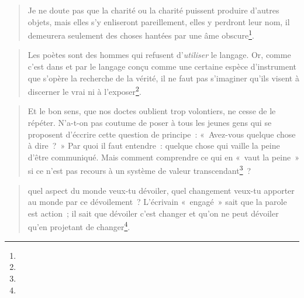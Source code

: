 \documentclass[12pt, a4paper]{article}
\begin{document}
\begin{quote}
    Je ne doute pas que la charité ou la charité puissent produire d'autres objets, mais elles s'y enliseront pareillement, elles y perdront leur nom, il demeurera seulement des choses hantées par une âme obscure\footnote{}.
\end{quote}
\begin{quote}
    Les poètes sont des hommes qui refusent d'\textit{utiliser} le langage. Or, comme c'est dans et par le langage conçu comme une certaine espèce d'instrument que s'opère la recherche de la vérité, il ne faut pas s'imaginer qu'ils visent à discerner le vrai ni à l'exposer\footnote{}.
\end{quote}

\begin{quote}
    Et le bon sens, que nos doctes oublient trop volontiers, ne cesse de le répéter. N'a-t-on pas coutume de poser à tous les jeunes gens qui se proposent d'éccrire cette question de principe~: «~Avez-vous quelque chose à dire~?~» Par quoi il faut entendre~: quelque chose qui vaille la peine d'être communiqué. Mais comment comprendre ce qui en «~vaut la peine~» si ce n'est pas recours à un système de valeur transcendant\footnote{}~? 
\end{quote}
\begin{quote}
    quel aspect du monde veux-tu dévoiler, quel changement veux-tu apporter au monde par ce dévoilement~? L'écrivain «~engagé~» sait que la parole est action~; il sait que dévoiler c'est changer et qu'on ne peut dévoiler qu'en projetant de changer\footnote{}.
\end{quote}
\end{document}
